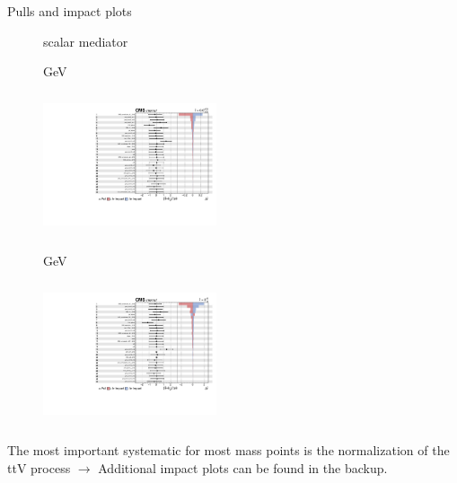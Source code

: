\documentclass[8pt]{beamer}
\begin{document}
\begin{frame}{Pulls and impact plots}
\justifying
\begin{figure}[htbp]
\centering
\begin{block}{ scalar mediator}\end{block}	\vspace{-8pt}

\begin{minipage}[b]{0.49\textwidth}
\begin{center}
\centering \begin{block}{ GeV}\end{block}	
\includegraphics[width=5.1cm, height=4.2cm]{figs/impacts_2016_both_scalar_100.pdf}
\end{center}
\end{minipage}\hfill
\begin{minipage}[b]{0.49\textwidth}
\begin{center}
\centering \begin{block}{ GeV}\end{block}	
\includegraphics[width=5.1cm, height=4.2cm]{figs/impacts_2016_both_scalar_500.pdf}
\end{center}
\end{minipage} \hfill
\end{figure}

The most important systematic for most mass points is the normalization of the ttV process $\rightarrow$ Additional impact plots can be found in the backup. \vfill
\end{frame}
\end{document}
